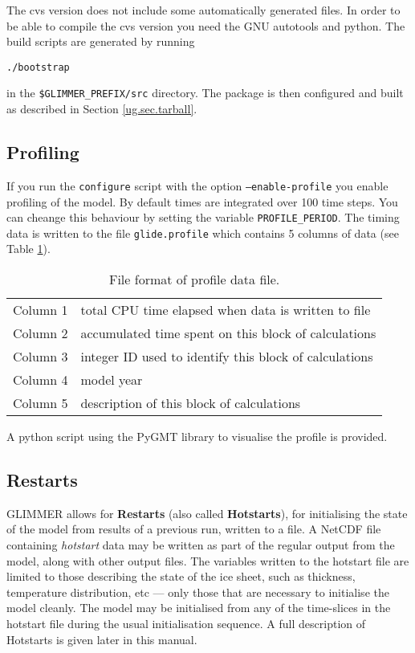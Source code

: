 The cvs version does not include some automatically generated files. In order to be able to compile the cvs version you need the GNU autotools and python. The build scripts are generated by running
\begin{verbatim}
./bootstrap
\end{verbatim}
in the \texttt{\$GLIMMER\_PREFIX/src} directory. The package is then configured and built as described in Section \ref{ug.sec.tarball}.
%
\subsection{Profiling}\label{ug.sec.profile}
If you run the \texttt{configure} script with the option \texttt{--enable-profile} you enable profiling of the model. By default times are integrated over 100 time steps. You can cheange this behaviour by setting the variable \texttt{PROFILE\_PERIOD}. The timing data is written to the file \texttt{glide.profile} which contains 5 columns of data (see Table \ref{ug.tab.profile_format}).
\begin{table}[htbp]
  \centering
  \begin{tabular}{|l|l|}
    \hline
    Column 1 &total CPU time elapsed when data is written to file\\
    Column 2 &accumulated time spent on this block of calculations\\
    Column 3 &integer ID used to identify this block of calculations\\
    Column 4 &model year\\
    Column 5 &description of this block of calculations\\
    \hline
  \end{tabular}
  \caption{File format of profile data file.}
  \label{ug.tab.profile_format}
\end{table}
A python script using the PyGMT library to visualise the profile is provided.
%
\subsection{Restarts}\label{ug.sec.restarts}
%
GLIMMER allows for {\bf Restarts} (also called {\bf Hotstarts}), for initialising the state of the model from results of a previous run, written to a file. A NetCDF file containing \emph{hotstart} data may be written as part of the regular output from the model, along with other output files. The variables written to the hotstart file are limited to those describing the state of the ice sheet, such as thickness, temperature distribution, etc --- only those that are necessary to initialise the model cleanly. The model may be initialised from any of the time-slices in the hotstart file during the usual initialisation sequence.
%
A full description of Hotstarts is given later in this manual.